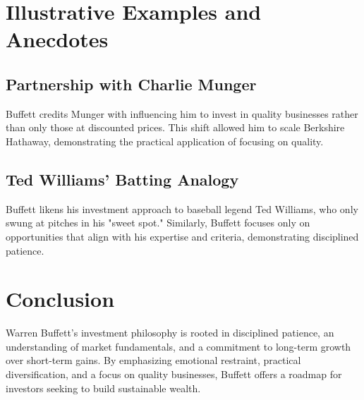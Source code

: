 \documentclass{article}
\begin{document}
\section{Illustrative Examples and Anecdotes}

\subsection*{Partnership with Charlie Munger}
Buffett credits Munger with influencing him to invest in quality businesses rather than only those at discounted prices. This shift allowed him to scale Berkshire Hathaway, demonstrating the practical application of focusing on quality.

\subsection*{Ted Williams’ Batting Analogy}
Buffett likens his investment approach to baseball legend Ted Williams, who only swung at pitches in his "sweet spot." Similarly, Buffett focuses only on opportunities that align with his expertise and criteria, demonstrating disciplined patience.

\section*{Conclusion}
Warren Buffett’s investment philosophy is rooted in disciplined patience, an understanding of market fundamentals, and a commitment to long-term growth over short-term gains. By emphasizing emotional restraint, practical diversification, and a focus on quality businesses, Buffett offers a roadmap for investors seeking to build sustainable wealth.
\end{document}
